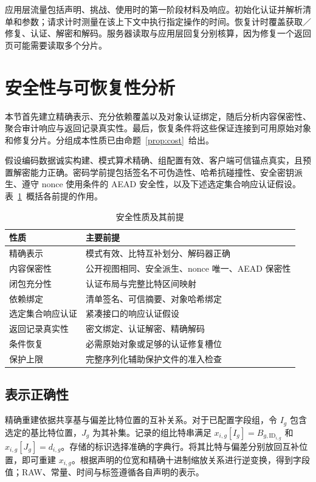 \documentclass[10pt,journal]{IEEEtran}
\begin{document}
应用层流量包括声明、挑战、使用时的第一阶段材料及响应。初始化认证并解析清单和参数；请求计时测量在该上下文中执行指定操作的时间。恢复计时覆盖获取／修复、认证、解密和解码。服务器读取与应用层回复分别核算，因为修复一个返回页可能需要读取多个分片。

\section{安全性与可恢复性分析}\label{sec:security}
本节首先建立精确表示、充分依赖覆盖以及对象认证绑定，随后分析内容保密性、聚合审计响应与返回记录真实性。最后，恢复条件将这些保证连接到可用原始对象和修复分片。分组成本性质已由命题~\ref{prop:cost}~给出。

假设编码数据诚实构建、模式算术精确、组配置有效、客户端可信锚点真实，且预置解密能力正确。密码学前提包括签名不可伪造性、哈希抗碰撞性、安全密钥派生、遵守 nonce 使用条件的 AEAD 安全性，以及下述选定集合响应认证假设。表~\ref{tab:security}~概括各前提的作用。

\begin{table}[t]\centering\small
\caption{安全性质及其前提}\label{tab:security}
\begin{tabular}{@{}>{\raggedright\arraybackslash}p{}>{\raggedright\arraybackslash}p{}@{}}\toprule
性质 & 主要前提\\\midrule
精确表示 & 模式有效、比特互补划分、解码器正确\\
内容保密性 & 公开视图相同、安全派生、nonce 唯一、AEAD 保密性\\
闭包充分性 & 认证布局与完整比特区间映射\\
依赖绑定 & 清单签名、可信摘要、对象哈希绑定\\
选定集合响应认证 & 紧凑接口的响应认证假设\\
返回记录真实性 & 密文绑定、认证解密、精确解码\\
条件恢复 & 必需原始对象或足够的认证修复槽位\\
保护上限 & 完整序列化辅助保护文件的准入检查\\\bottomrule
\end{tabular}\end{table}

\subsection{表示正确性}\label{sec:representation-proof}
精确重建依据共享基与偏差比特位置的互补关系。对于已配置字段组，令 $I_g$ 包含选定的基比特位置，$J_g$ 为其补集。记录的组比特串满足 $x_{i,g}[I_g]=B_{g,\mathrm{ID}_{i,g}}$ 和 $x_{i,g}[J_g]=d_{i,g}$。存储的标识选择准确的字典行。将其比特与偏差分别放回互补位置，即可重建 $x_{i,g}$。根据声明的位宽和精确十进制缩放关系进行逆变换，得到字段值；RAW、常量、时间与标签遵循各自声明的表示。
\end{document}
